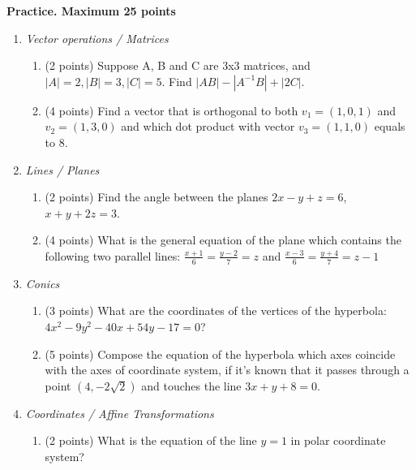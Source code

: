 \documentclass[]{exam}
\begin{document}
\begin{center}
\textbf{Practice. Maximum 25 points}    
\end{center}
\begin{enumerate}
\item \textit{Vector operations / Matrices} 
\begin{enumerate}
\item (2 points) Suppose A, B and C are 3x3 matrices, and $|A|=2, |B|=3,|C|=5$. Find $|AB|-|A^{-1}B| + |2C|$.

\item (4 points) Find a vector that is orthogonal to both $v_1= (1,0,1)$ and $v_2=(1,3,0)$ and which dot product with vector $v_3=(1,1,0)$ equals to $8$.

\end{enumerate}

\item  \textit{Lines / Planes}
\begin{enumerate}
\item (2 points) Find the angle between the planes $2x - y + z = 6$, $ x + y + 2z = 3$.

\item (4 points)  What is the general equation of the plane which contains the following two parallel lines:
$\frac{x+1}{6} = \frac{y-2}{7} = z $
and 
$\frac{x-3}{6} = \frac{y+4}{7} = z -1 $
\end{enumerate}


\item \textit{Conics}
\begin{enumerate}
\item (3 points) What are the coordinates of the vertices of the hyperbola:
$4x^2-9y^2-40x+54y-17=0$? 

\item (5 points) 
Compose the equation of the hyperbola which axes coincide with the axes of coordinate system, if it's known that it passes through a point $(4,-2\sqrt{2})$ and touches the line $3x+y+8=0$.


\end{enumerate}

\item \textit{Coordinates / Affine Transformations}
\begin{enumerate}
\item (2 points) What is the equation of the line $y=1$ in polar coordinate system?


\end{enumerate}
\end{enumerate}
\end{document}

